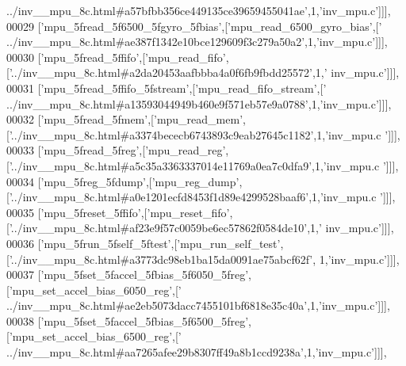 \begin{DoxyCode}
{      ../inv\_\_mpu\_8c.html#a57bfbb356ce449135ce39659455041ae'},1,\textcolor{stringliteral}{'inv\_mpu.c'}]]],
00029   [\textcolor{stringliteral}{'mpu\_5fread\_5f6500\_5fgyro\_5fbias'},[\textcolor{stringliteral}{'mpu\_read\_6500\_gyro\_bias'},[\textcolor{stringliteral}{'
      ../inv\_\_mpu\_8c.html#ae387f1342e10bce129609f3c279a50a2'},1,\textcolor{stringliteral}{'inv\_mpu.c'}]]],
00030   [\textcolor{stringliteral}{'mpu\_5fread\_5ffifo'},[\textcolor{stringliteral}{'mpu\_read\_fifo'},[\textcolor{stringliteral}{'../inv\_\_mpu\_8c.html#a2da20453aafbbba4a0f6fb9fbdd25572'},1,\textcolor{stringliteral}{'
      inv\_mpu.c'}]]],
00031   [\textcolor{stringliteral}{'mpu\_5fread\_5ffifo\_5fstream'},[\textcolor{stringliteral}{'mpu\_read\_fifo\_stream'},[\textcolor{stringliteral}{'
      ../inv\_\_mpu\_8c.html#a13593044949b460e9f571eb57e9a0788'},1,\textcolor{stringliteral}{'inv\_mpu.c'}]]],
00032   [\textcolor{stringliteral}{'mpu\_5fread\_5fmem'},[\textcolor{stringliteral}{'mpu\_read\_mem'},[\textcolor{stringliteral}{'../inv\_\_mpu\_8c.html#a3374bececb6743893c9eab27645c1182'},1,\textcolor{stringliteral}{'inv\_mpu.c
      '}]]],
00033   [\textcolor{stringliteral}{'mpu\_5fread\_5freg'},[\textcolor{stringliteral}{'mpu\_read\_reg'},[\textcolor{stringliteral}{'../inv\_\_mpu\_8c.html#a5c35a3363337014e11769a0ea7c0dfa9'},1,\textcolor{stringliteral}{'inv\_mpu.c
      '}]]],
00034   [\textcolor{stringliteral}{'mpu\_5freg\_5fdump'},[\textcolor{stringliteral}{'mpu\_reg\_dump'},[\textcolor{stringliteral}{'../inv\_\_mpu\_8c.html#a0e1201ecfd8453f1d89e4299528baaf6'},1,\textcolor{stringliteral}{'inv\_mpu.c
      '}]]],
00035   [\textcolor{stringliteral}{'mpu\_5freset\_5ffifo'},[\textcolor{stringliteral}{'mpu\_reset\_fifo'},[\textcolor{stringliteral}{'../inv\_\_mpu\_8c.html#af23e9f57c0059be6ec57862f0584de10'},1,\textcolor{stringliteral}{'
      inv\_mpu.c'}]]],
00036   [\textcolor{stringliteral}{'mpu\_5frun\_5fself\_5ftest'},[\textcolor{stringliteral}{'mpu\_run\_self\_test'},[\textcolor{stringliteral}{'../inv\_\_mpu\_8c.html#a3773dc98eb1ba15da0091ae75abcf62f'},
      1,\textcolor{stringliteral}{'inv\_mpu.c'}]]],
00037   [\textcolor{stringliteral}{'mpu\_5fset\_5faccel\_5fbias\_5f6050\_5freg'},[\textcolor{stringliteral}{'mpu\_set\_accel\_bias\_6050\_reg'},[\textcolor{stringliteral}{'
      ../inv\_\_mpu\_8c.html#ae2eb5073dacc7455101bf6818e35c40a'},1,\textcolor{stringliteral}{'inv\_mpu.c'}]]],
00038   [\textcolor{stringliteral}{'mpu\_5fset\_5faccel\_5fbias\_5f6500\_5freg'},[\textcolor{stringliteral}{'mpu\_set\_accel\_bias\_6500\_reg'},[\textcolor{stringliteral}{'
      ../inv\_\_mpu\_8c.html#aa7265afee29b8307ff49a8b1ccd9238a'},1,\textcolor{stringliteral}{'inv\_mpu.c'}]]],

\end{DoxyCode}
